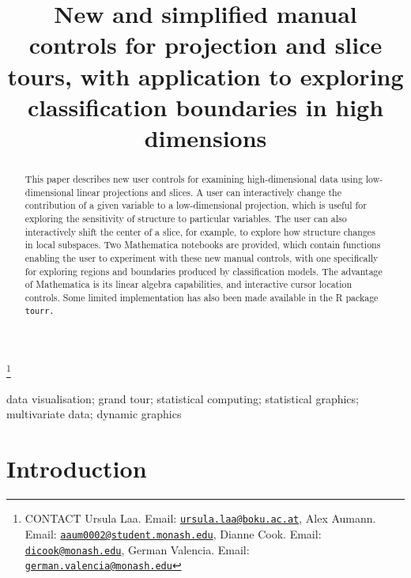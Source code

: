\documentclass[]{interact}
\theoremstyle{plain}%
\theoremstyle{definition}
\theoremstyle{remark}
\begin{document}

\title{New and simplified manual controls for projection and slice
tours, with application to exploring classification boundaries in high
dimensions}


\author{
}

\thanks{CONTACT Ursula
Laa. Email: \href{mailto:ursula.laa@boku.ac.at}{\nolinkurl{ursula.laa@boku.ac.at}}, Alex
Aumann. Email: \href{mailto:aaum0002@student.monash.edu}{\nolinkurl{aaum0002@student.monash.edu}}, Dianne
Cook. Email: \href{mailto:dicook@monash.edu}{\nolinkurl{dicook@monash.edu}}, German
Valencia. Email: \href{mailto:german.valencia@monash.edu}{\nolinkurl{german.valencia@monash.edu}}}

\maketitle

\begin{abstract}
This paper describes new user controls for examining high-dimensional
data using low-dimensional linear projections and slices. A user can
interactively change the contribution of a given variable to a
low-dimensional projection, which is useful for exploring the
sensitivity of structure to particular variables. The user can also
interactively shift the center of a slice, for example, to explore how
structure changes in local subspaces. Two Mathematica notebooks are
provided, which contain functions enabling the user to experiment with
these new manual controls, with one specifically for exploring regions
and boundaries produced by classification models. The advantage of
Mathematica is its linear algebra capabilities, and interactive cursor
location controls. Some limited implementation has also been made
available in the R package \tt{tourr}. 
\end{abstract}

\begin{keywords}
data visualisation; grand tour; statistical computing; statistical
graphics; multivariate data; dynamic graphics
\end{keywords}

\hypertarget{introduction}{%
\section{Introduction}\label{introduction}}
\end{document}
